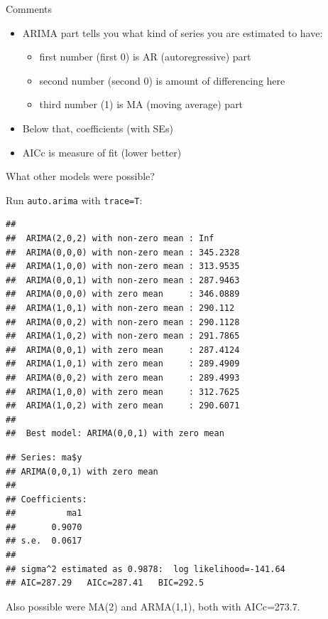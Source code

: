 \documentclass[ignorenonframetext,]{beamer}
\newenvironment{Shaded}{\begin{snugshade}}{\end{snugshade}}
\newcommand{\DataTypeTok}[1]{\textcolor[rgb]{0.13,0.29,0.53}{#1}}
\newcommand{\KeywordTok}[1]{\textcolor[rgb]{0.13,0.29,0.53}{\textbf{#1}}}
\newcommand{\NormalTok}[1]{#1}
\newcommand{\OperatorTok}[1]{\textcolor[rgb]{0.81,0.36,0.00}{\textbf{#1}}}
\providecommand{\tightlist}{%
  \setlength{\itemsep}{0pt}\setlength{\parskip}{0pt}}
\begin{document}
\begin{frame}{Comments}
\protect\hypertarget{comments-52}{}

\begin{itemize}
\tightlist
\item
  ARIMA part tells you what kind of series you are estimated to have:

  \begin{itemize}
  \tightlist
  \item
    first number (first 0) is AR (autoregressive) part
  \item
    second number (second 0) is amount of differencing here
  \item
    third number (1) is MA (moving average) part
  \end{itemize}
\item
  Below that, coefficients (with SEs)
\item
  AICc is measure of fit (lower better)
\end{itemize}

\end{frame}

\begin{frame}[fragile]{What other models were possible?}
\protect\hypertarget{what-other-models-were-possible}{}

Run \texttt{auto.arima} with \texttt{trace=T}:

\small

\begin{Shaded}
\end{Shaded}

\begin{verbatim}
## 
##  ARIMA(2,0,2) with non-zero mean : Inf
##  ARIMA(0,0,0) with non-zero mean : 345.2328
##  ARIMA(1,0,0) with non-zero mean : 313.9535
##  ARIMA(0,0,1) with non-zero mean : 287.9463
##  ARIMA(0,0,0) with zero mean     : 346.0889
##  ARIMA(1,0,1) with non-zero mean : 290.112
##  ARIMA(0,0,2) with non-zero mean : 290.1128
##  ARIMA(1,0,2) with non-zero mean : 291.7865
##  ARIMA(0,0,1) with zero mean     : 287.4124
##  ARIMA(1,0,1) with zero mean     : 289.4909
##  ARIMA(0,0,2) with zero mean     : 289.4993
##  ARIMA(1,0,0) with zero mean     : 312.7625
##  ARIMA(1,0,2) with zero mean     : 290.6071
## 
##  Best model: ARIMA(0,0,1) with zero mean
\end{verbatim}

\begin{verbatim}
## Series: ma$y 
## ARIMA(0,0,1) with zero mean 
## 
## Coefficients:
##          ma1
##       0.9070
## s.e.  0.0617
## 
## sigma^2 estimated as 0.9878:  log likelihood=-141.64
## AIC=287.29   AICc=287.41   BIC=292.5
\end{verbatim}

\normalsize

Also possible were MA(2) and ARMA(1,1), both with AICc=273.7.

\end{frame}
\end{document}
